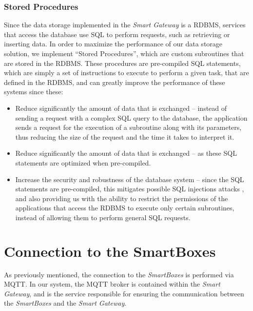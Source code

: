 \subsubsection{Stored Procedures}

Since the data storage implemented in the \textit{Smart Gateway} is a \acs{RDBMS}, services that access the database use \acf{SQL} to perform requests, such as retrieving or inserting data. In order to maximize the performance of our data storage solution, we implement ``Stored Procedures'', which are custom subroutines that are stored in the \acs{RDBMS}. These procedures are pre-compiled \acs{SQL} statements, which are simply a set of instructions to execute to perform a given task, that are defined in the \acs{RDBMS}, and can greatly improve the performance of these systems since these:

\begin{itemize}
    \item Reduce significantly the amount of data that is exchanged -- instead of sending a request with a complex \acs{SQL} query to the database, the application sends a request for the execution of a subroutine along with its parameters, thus reducing the size of the request and the time it takes to interpret it.
    \item Reduce significantly the amount of data that is exchanged -- as these \acs{SQL} statements are optimized when pre-compiled.
    \item Increase the security and robustness of the database system -- since the \acs{SQL} statements are pre-compiled, this mitigates possible \acs{SQL} injections attacks \cite{clarke2012sql}, and also providing us with the ability to restrict the permissions of the applications that access the \acs{RDBMS} to execute only certain subroutines, instead of allowing them to perform general \acs{SQL} requests.
\end{itemize}


\section{Connection to the SmartBoxes}


As previously mentioned, the connection to the \textit{SmartBoxes} is performed via \acs{MQTT}. In our system, the \acs{MQTT} broker is contained within the \textit{Smart Gateway}, and is the service responsible for ensuring the communication between the \textit{SmartBoxes} and the \textit{Smart Gateway}.

